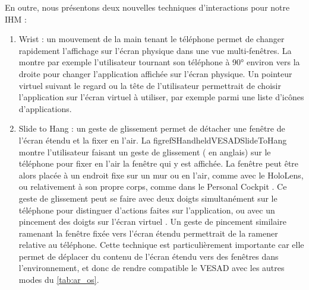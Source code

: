 En outre, nous présentons deux nouvelles techniques d'interactions pour notre IHM :
\begin{enumerate}
  \item Wrist : un mouvement de la main tenant le téléphone permet de changer rapidement l'affichage sur l'écran physique dans une vue multi-fenêtres. La  montre par exemple l'utilisateur tournant son téléphone à \ang{90} environ vers la droite pour changer l'application affichée sur l'écran physique. Un pointeur virtuel suivant le regard ou la tête de l'utilisateur permettrait de choisir l'application sur l'écran virtuel à utiliser, par exemple parmi une liste d'icônes d'applications.
  \item Slide to Hang : un geste de glissement permet de détacher une fenêtre de l'écran étendu et la fixer en l'air. La figrefS{HandheldVESADSlideToHang} montre l'utilisateur faisant un geste de glissement ( en anglais) sur le téléphone pour fixer en l'air la fenêtre qui y est affichée. La fenêtre peut être alors placée à un endroit fixe sur un mur ou en l'air, comme avec le HoloLens, ou relativement à son propre corps, comme dans le Personal Cockpit \cite{Ens2014}. Ce geste de glissement peut se faire avec deux doigts simultanément sur le téléphone pour distinguer d'actions faites sur l'application, ou avec un pincement des doigts sur l'écran virtuel \cite{Piumsomboon2014}. Un geste de pincement similaire ramenant la fenêtre fixée vers l'écran étendu permettrait de la ramener relative au téléphone. Cette technique est particulièrement importante car elle permet de déplacer du contenu de l'écran étendu vers des fenêtres dans l'environnement, et donc de rendre compatible le VESAD avec les autres modes du \autoref{tab:ar_os}.
\end{enumerate}